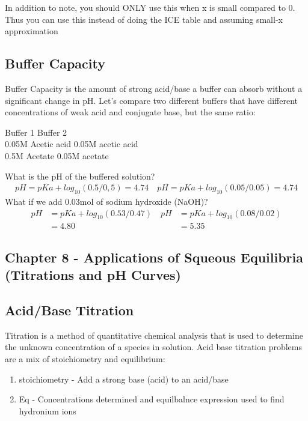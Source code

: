 \documentclass[../CHEM152Notes.tex]{subfiles}
\begin{document}
In addition to note, you should ONLY use this when x is small compared to 0. Thus you can use this instead of doing the ICE table and assuming small-x approximation

\subsection*{Buffer Capacity}
Buffer Capacity is the amount of strong acid/base a buffer can absorb without a significant change in pH. 
\newline
Let's compare two different buffers that have different concentrations of weak acid and conjugate base, but the same ratio:
\begin{center}
    Buffer 1 \quad Buffer 2 \\
    0.05M Acetic acid \quad 0.05M acetic acid \\
    0.5M Acetate \quad 0.05M acetate
\end{center}
What is the pH of the buffered solution?
\begin{equation*}
    \begin{aligned}
        pH  = pKa + log_{10}(0.5/0,5) = 4.74 \quad pH  = pKa + log_{10}(0.05/0.05) = 4.74
    \end{aligned}
\end{equation*}
What if we add 0.03mol of sodium hydroxide (NaOH)?
\begin{equation*}
    \begin{aligned}
        pH  &= pKa + log_{10}(0.53/0.47) \quad pH  &= pKa + log_{10}(0.08/0.02) \\
        &= 4.80 \quad &= 5.35
    \end{aligned}
\end{equation*} %

\subsection*{Chapter 8 - Applications of Squeous Equilibria (Titrations and pH Curves)}

\subsection*{Acid/Base Titration}
Titration is a method of quantitative chemical analysis that is used to determine the unknown concentration of a species in solution. 
\newline
Acid base titration problems are a mix of stoichiometry and equilibrium:
\begin{enumerate}
    \item stoichiometry - Add a strong base (acid) to an acid/base
    \item Eq - Concentrations determined and equilbalnce expression used to find hydronium ions
\end{enumerate}
\end{document}
